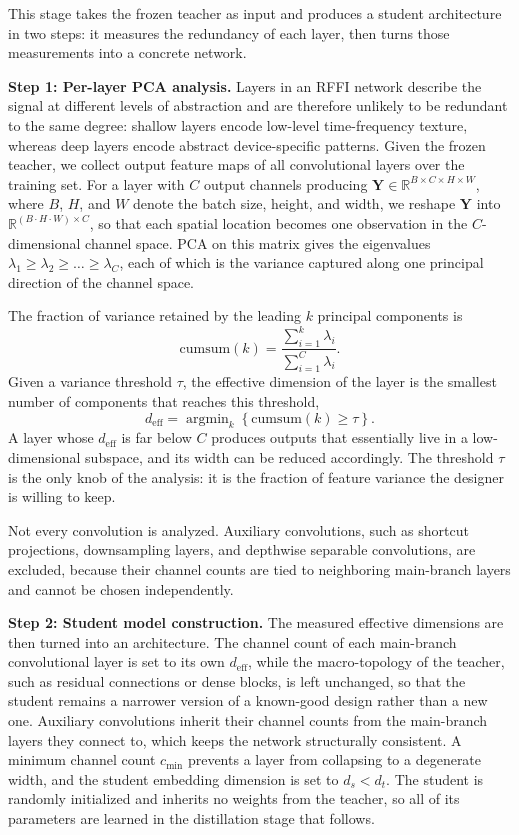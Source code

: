 \documentclass[journal,comsoc]{IEEEtran}
\DeclareMathOperator*{\argmin}{argmin}
\begin{document}
This stage takes the frozen teacher as input and produces a student architecture in two steps: it measures the redundancy of each layer, then turns those measurements into a concrete network.

\textbf{Step 1: Per-layer PCA analysis.}
Layers in an RFFI network describe the signal at different levels of abstraction and are therefore unlikely to be redundant to the same degree: shallow layers encode low-level time-frequency texture, whereas deep layers encode abstract device-specific patterns.
Given the frozen teacher, we collect output feature maps of all convolutional layers over the training set.
For a layer with $C$ output channels producing $\mathbf{Y} \in \mathbb{R}^{B \times C \times H \times W}$, where $B$, $H$, and $W$ denote the batch size, height, and width, we reshape $\mathbf{Y}$ into $\mathbb{R}^{(B\cdot H\cdot W) \times C}$, so that each spatial location becomes one observation in the $C$-dimensional channel space.
PCA on this matrix gives the eigenvalues $\lambda_1 \ge \lambda_2 \ge \dots \ge \lambda_C$, each of which is the variance captured along one principal direction of the channel space.

The fraction of variance retained by the leading $k$ principal components is
\begin{equation}
\label{eq:cumsum}
\text{cumsum}(k) = \frac{\sum_{i=1}^{k} \lambda_i}{\sum_{i=1}^{C} \lambda_i}.
\end{equation}
Given a variance threshold $\tau$, the effective dimension of the layer is the smallest number of components that reaches this threshold,
\begin{equation}
\label{eq:eff_dim}
d_{\text{eff}} = \argmin_k \left\{ \text{cumsum}(k) \geq \tau \right\}.
\end{equation}
A layer whose $d_{\text{eff}}$ is far below $C$ produces outputs that essentially live in a low-dimensional subspace, and its width can be reduced accordingly.
The threshold $\tau$ is the only knob of the analysis: it is the fraction of feature variance the designer is willing to keep.

Not every convolution is analyzed.
Auxiliary convolutions, such as shortcut projections, downsampling layers, and depthwise separable convolutions, are excluded, because their channel counts are tied to neighboring main-branch layers and cannot be chosen independently.

\textbf{Step 2: Student model construction.}
The measured effective dimensions are then turned into an architecture.
The channel count of each main-branch convolutional layer is set to its own $d_{\text{eff}}$, while the macro-topology of the teacher, such as residual connections or dense blocks, is left unchanged, so that the student remains a narrower version of a known-good design rather than a new one.
Auxiliary convolutions inherit their channel counts from the main-branch layers they connect to, which keeps the network structurally consistent.
A minimum channel count $c_{\min}$ prevents a layer from collapsing to a degenerate width, and the student embedding dimension is set to $d_s < d_t$.
The student is randomly initialized and inherits no weights from the teacher, so all of its parameters are learned in the distillation stage that follows.
\end{document}
